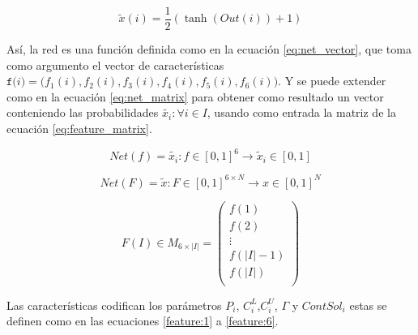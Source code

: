 \documentclass[spanish, a4paper, 12pt, openany,final]{book}
\begin{document}
\begin{equation}
	\tilde{x}(i) = \frac{1}{2}\left( \tanh(Out(i)) + 1 \right)
	\label{eq:soltransformation}	
\end{equation}


Así, la red es una función definida como en la ecuación \eqref{eq:net_vector}, que toma como argumento el vector de características $\texttt{f($i$)} = \textbf{(}f_1(i),f_2(i),f_3(i),f_4(i),f_5(i),f_6(i)\textbf{)}$. Y se puede extender como en la ecuación \eqref{eq:net_matrix} para obtener como resultado un vector conteniendo las probabilidades $\tilde{x_i} :\forall i \in I$, usando como entrada la matriz de la ecuación \eqref{eq:feature_matrix}.

\begin{equation}
	\label{eq:net_vector}
	Net(f) = \tilde{x_i}: f\in [0,1]^6 \rightarrow \tilde{x}_i \in[0,1]
\end{equation}

\begin{equation}
	\label{eq:net_matrix}
	Net(F) = \tilde{x}: F\in [0,1]^{6\times N} \rightarrow x \in[0,1]^{N}
\end{equation}

\begin{equation}
	F(I) \in M_{6 \times |I|} = 
	\left( 
	\begin{matrix}
		f(1)\\
		f(2)\\
		\vdots \\
		f(|I|-1)\\
		f(|I|)\\
	\end{matrix}
	\right)
	\label{eq:feature_matrix}
\end{equation}

Las características codifican los parámetros $P_i$, $C^L_i$,$C^U_i$, $\Gamma$ y $ContSol_i$ estas se definen como en las ecuaciones \eqref{feature:1} a \eqref{feature:6}.
\end{document}
